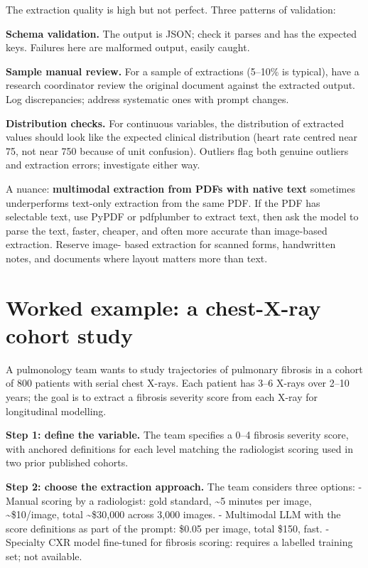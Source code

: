 \documentclass[
  letterpaper,
  11pt]{scrbook}
\begin{document}
The extraction quality is high but not perfect. Three patterns of
validation:

\textbf{Schema validation.} The output is JSON; check it parses and has
the expected keys. Failures here are malformed output, easily caught.

\textbf{Sample manual review.} For a sample of extractions (5--10\% is
typical), have a research coordinator review the original document
against the extracted output. Log discrepancies; address systematic ones
with prompt changes.

\textbf{Distribution checks.} For continuous variables, the distribution
of extracted values should look like the expected clinical distribution
(heart rate centred near 75, not near 750 because of unit confusion).
Outliers flag both genuine outliers and extraction errors; investigate
either way.

A nuance: \textbf{multimodal extraction from PDFs with native text}
sometimes underperforms text-only extraction from the same PDF. If the
PDF has selectable text, use PyPDF or pdfplumber to extract text, then
ask the model to parse the text, faster, cheaper, and often more
accurate than image-based extraction. Reserve image- based extraction
for scanned forms, handwritten notes, and documents where layout matters
more than text.

\section{Worked example: a chest-X-ray cohort
study}\label{worked-example-a-chest-x-ray-cohort-study}

A pulmonology team wants to study trajectories of pulmonary fibrosis in
a cohort of 800 patients with serial chest X-rays. Each patient has 3--6
X-rays over 2--10 years; the goal is to extract a fibrosis severity
score from each X-ray for longitudinal modelling.

\textbf{Step 1: define the variable.} The team specifies a 0--4 fibrosis
severity score, with anchored definitions for each level matching the
radiologist scoring used in two prior published cohorts.

\textbf{Step 2: choose the extraction approach.} The team considers
three options: - Manual scoring by a radiologist: gold standard,
\textasciitilde5 minutes per image, \textasciitilde\$10/image, total
\textasciitilde\$30,000 across 3,000 images. - Multimodal LLM with the
score definitions as part of the prompt: \$0.05 per image, total \$150,
fast. - Specialty CXR model fine-tuned for fibrosis scoring: requires a
labelled training set; not available.
\end{document}
